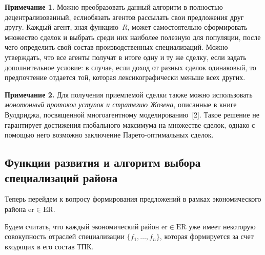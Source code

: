 \begin{multicols}{2}
\medskip

\noindent
\textbf{Примечание 1.} Можно преобразовать данный ал\-горитм в полностью 
децентрализованный, если\linebreak обязать агентов рассылать свои предложения друг 
другу. Каждый агент, зная функцию~$R$, может самостоятельно сформировать 
множество сделок и выбрать среди них наиболее полезную для популяции, 
после чего определить свой состав производственных специализаций. Можно 
утверждать, что все агенты получат в итоге одну и ту же сделку, если задать 
дополнительное условие: в случае, если доход от разных сделок одинаковый, то 
предпочтение отдается той, которая лексикографически меньше всех других.
\smallskip

\noindent
\textbf{Примечание 2.} Для получения приемлемой сделки также можно 
использовать \textit{монотонный протокол уступок и стратегию Жозена}, 
описанные в книге Вулдриджа, посвященной многоагентному 
моделированию~[2]. Такое решение не гарантирует достижения глобального 
максимума на множестве сделок, однако с помощью него возможно заключение 
Па\-ре\-то-оп\-ти\-маль\-ных сделок.

\subsection{Функции развития и алгоритм выбора специализаций района}

  Теперь перейдем к вопросу формирования предложений в рамках 
экономического района $\mathrm{er}\in \mathrm{ER}$.
  
  Будем считать, что каждый экономический район $\mathrm{er}\in \mathrm{ER}$ уже имеет 
некоторую совокупность отраслей специализации $\{f_1, \ldots , f_n\}$, которая 
формируется за счет входящих в его состав ТПК.
  

\end{multicols}

